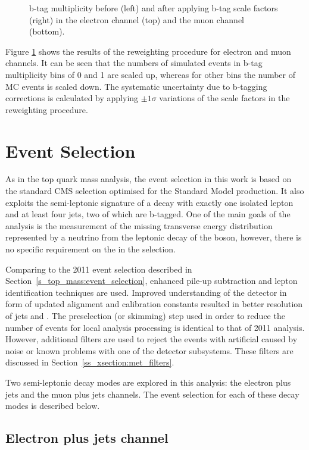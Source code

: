 \begin{figure}[!htpb]
	\caption{\label{fig:bjet_weights}
    b-tag multiplicity before (left) and after applying b-tag scale factors (right) in the electron channel (top) and
    the muon channel (bottom).}
\end{figure}

Figure \ref{fig:bjet_weights} shows the results of the reweighting procedure for electron and muon channels. It can be
seen that the numbers of simulated events in b-tag multiplicity bins of \num{0} and \num{1} are scaled up, whereas for
other bins the number of MC events is scaled down. The systematic uncertainty due to b-tagging corrections is calculated
by applying $\pm 1 \sigma$ variations of the scale factors in the reweighting procedure.

\section{Event Selection}
\label{s_xsection:event_selection}
As in the top quark mass analysis, the event selection in this work is based on the standard CMS selection optimised for
the Standard Model \ttbar production. It also exploits the semi-leptonic signature of a \ttbar decay with exactly one
isolated lepton and at least four jets, two of which are b-tagged. One of the main goals of the analysis is the
measurement of the missing transverse energy distribution represented by a neutrino from the leptonic decay of the \W
boson, however, there is no specific requirement on the \MET in the selection.

Comparing to the 2011 event selection described in Section~\ref{s_top_mass:event_selection}, enhanced pile-up
subtraction and lepton identification techniques are used. Improved understanding of the detector in form of updated
alignment and calibration constants resulted in better resolution of jets and \MET. The preselection (or skimming) step
used in order to reduce the number of events for local analysis processing is identical to that of 2011 analysis.
However, additional filters are used to reject the events with artificial \MET caused by noise or known problems with
one of the detector subsystems. These filters are discussed in Section~\ref{ss_xsection:met_filters}.

Two semi-leptonic \ttbar decay modes are explored in this analysis: the electron plus jets and the muon plus jets
channels. The event selection for each of these decay modes is described below.

\subsection{Electron plus jets channel}
\label{ss_xsection:ejets}

